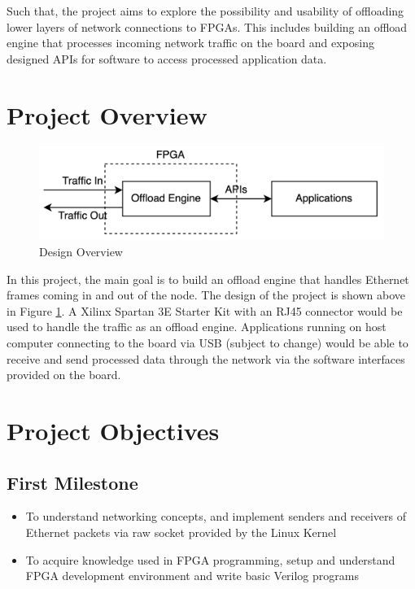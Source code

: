\documentclass[a4paper,11pt]{scrartcl}
\begin{document}
Such that, the project aims to explore the possibility and usability of offloading lower layers of network connections to FPGAs. This includes building an offload engine that processes incoming network traffic on the board and exposing designed APIs for software to access processed application data.

\section{Project Overview}
\begin{figure}[h]
    \includegraphics[width=\textwidth]{imgs/design.png}
    \caption{Design Overview}
    \label{design-overview}
\end{figure}

In this project, the main goal is to build an offload engine that handles Ethernet frames coming in and out of the node. The design of the project is shown above in Figure \ref{design-overview}. A Xilinx Spartan 3E Starter Kit with an RJ45 connector would be used to handle the traffic as an offload engine. Applications running on host computer connecting to the board via USB (subject to change) would be able to receive and send processed data through the network via the software interfaces provided on the board.

\section{Project Objectives}

\subsection{First Milestone}
\begin{itemize}
    \item To understand networking concepts, and implement senders and receivers of Ethernet packets via raw socket provided by the Linux Kernel
    \item To acquire knowledge used in FPGA programming, setup and understand FPGA development environment and write basic Verilog programs
\end{itemize}
\end{document}

